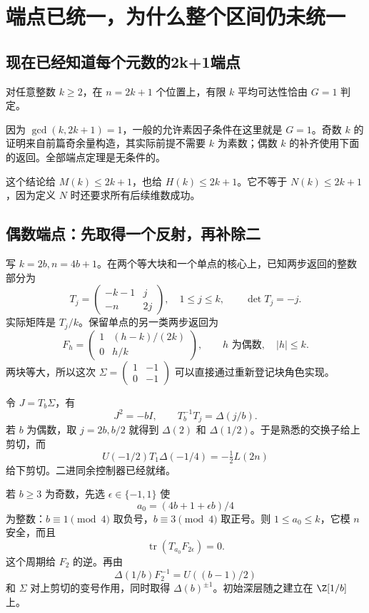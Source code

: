 \chapter{端点已统一，为什么整个区间仍未统一}\label{ch:intervals}
\section{现在已经知道每个元数的2k+1端点}
\begin{theorem}[所有元数的共同端点]
对任意整数 $k\ge2$，在 $n=2k+1$ 个位置上，有限 $k$ 平均可达性恰由 $G=1$ 判定。
\end{theorem}
因为 $\gcd(k,2k+1)=1$，一般的允许素因子条件在这里就是 $G=1$。奇数 $k$ 的证明来自前篇奇余量构造，其实际前提不需要 $k$ 为素数；偶数 $k$ 的补齐使用下面的返回。全部端点定理是无条件的。

这个结论给 $M(k)\le2k+1$，也给 $H(k)\le2k+1$。它不等于 $N(k)\le2k+1$，因为定义 $N$ 时还要求所有后续维数成功。

\section{偶数端点：先取得一个反射，再补除二}
写 $k=2b,n=4b+1$。在两个等大块和一个单点的核心上，已知两步返回的整数部分为
\[T_j=\begin{pmatrix}-k-1&j\\-n&2j\end{pmatrix},
\quad1\le j\le k,\qquad\det T_j=-j.
\]
实际矩阵是 $T_j/k$。保留单点的另一类两步返回为
\[F_h=\begin{pmatrix}1&(h-k)/(2k)\\0&h/k\end{pmatrix},
\qquad h\text{ 为偶数},\quad|h|\le k.
\]
两块等大，所以这次 $\Sigma=\left(\begin{smallmatrix}1&-1\\0&-1\end{smallmatrix}\right)$ 可以直接通过重新登记块角色实现。

令 $J=T_b\Sigma$，有
\[J^2=-bI,\qquad T_b^{-1}T_j=\Delta(j/b).
\]
若 $b$ 为偶数，取 $j=2b,b/2$ 就得到 $\Delta(2)$ 和 $\Delta(1/2)$。于是熟悉的交换子给上剪切，而
\[U(-1/2)T_1\Delta(-1/4)=-\tfrac12L(2n)
\]
给下剪切。二进同余控制器已经就绪。

若 $b\ge3$ 为奇数，先选 $\epsilon\in\{-1,1\}$ 使
\[a_0=(4b+1+\epsilon b)/4
\]
为整数：$b\equiv1\pmod4$ 取负号，$b\equiv3\pmod4$ 取正号。则 $1\le a_0\le k$，它模 $n$ 安全，而且
\[\operatorname{tr}(T_{a_0}F_{2\epsilon})=0.
\]
这个周期给 $F_2$ 的逆。再由
\[\Delta(1/b)F_2^{-1}=U((b-1)/2)
\]
和 $\Sigma$ 对上剪切的变号作用，同时取得 $\Delta(b)^{\pm1}$。初始深层随之建立在 $\Z[1/b]$ 上。

